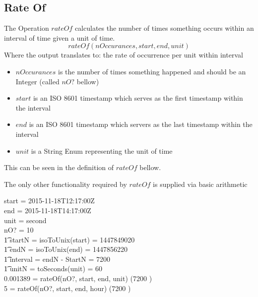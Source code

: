 \documentclass[../../main.tex]{subfiles}
\begin{document}
\subsection{Rate Of}
The Operation $rateOf$ calculates the number of times something occurs
within an interval of time given a unit of time.
$$rateOf(nOccurances, start, end, unit)$$
Where the output translates to: the rate of occurrence per unit within interval
\begin{itemize}
\item $nOccurances$ is the number of times something happened and should be an Integer (called $nO?$ bellow)
\item $start$ is an ISO 8601 timestamp which serves as the first timestamp within the interval
\item $end$ is an ISO 8601 timestamp which servers as the last timestamp within the interval
\item $unit$ is a String Enum representing the unit of time
\end{itemize}
This can be seen in the definition of $rateOf$ bellow.
The only other functionality required by $rateOf$ is supplied via basic arithmetic
\begin{argue}
  start = 2015-11-18T12:17:00Z \\
  end = 2015-11-18T14:17:00Z \\
  unit = second \\
  nO? = 10 \\
  \t1 startN = isoToUnix(start) = 1447849020 \\
  \t1 endN = isoToUnix(end) = 1447856220 \\
  \t1 interval = endN - StartN = 7200\\
  \t1 unitN = toSeconds(unit) = 60 \\
  0.001389 = rateOf(nO?, start, end, unit)  \div (7200 ) \\
  5 = rateOf(nO?, start, end, hour)  \div (7200 )
\end{argue}
\end{document}
